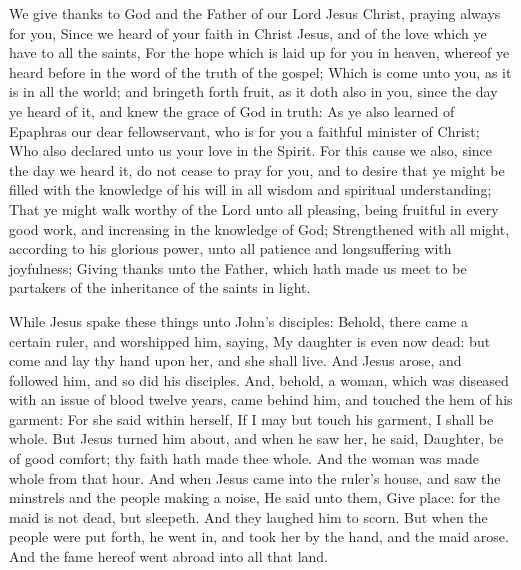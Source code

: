  We give thanks to God and the Father of our Lord Jesus Christ, praying always for you, Since we heard of your faith in Christ Jesus, and of the love which ye have to all the saints, For the hope which is laid up for you in heaven, whereof ye heard before in the word of the truth of the gospel; Which is come unto you, as it is in all the world; and bringeth forth fruit, as it doth also in you, since the day ye heard of it, and knew the grace of God in truth: As ye also learned of Epaphras our dear fellowservant, who is for you a faithful minister of Christ; Who also declared unto us your love in the Spirit. For this cause we also, since the day we heard it, do not cease to pray for you, and to desire that ye might be filled with the knowledge of his will in all wisdom and spiritual understanding; That ye might walk worthy of the Lord unto all pleasing, being fruitful in every good work, and increasing in the knowledge of God; Strengthened with all might, according to his glorious power, unto all patience and longsuffering with joyfulness; Giving thanks unto the Father, which hath made us meet to be partakers of the inheritance of the saints in light.


\vspace{-0.25\baselineskip}

 While Jesus spake these things unto John's disciples: Behold, there came a certain ruler, and worshipped him, saying, My daughter is even now dead: but come and lay thy hand upon her, and she shall live. And Jesus arose, and followed him, and so did his disciples. And, behold, a woman, which was diseased with an issue of blood twelve years, came behind him, and touched the hem of his garment: For she said within herself, If I may but touch his garment, I shall be whole. But Jesus turned him about, and when he saw her, he said, Daughter, be of good comfort; thy faith hath made thee whole. And the woman was made whole from that hour. And when Jesus came into the ruler's house, and saw the minstrels and the people making a noise, He said unto them, Give place: for the maid is not dead, but sleepeth. And they laughed him to scorn. But when the people were put forth, he went in, and took her by the hand, and the maid arose. And the fame hereof went abroad into all that land.

